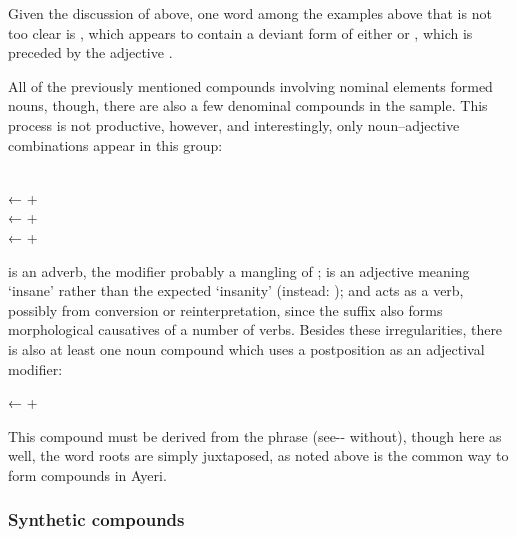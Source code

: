 Given the discussion of  above, one word among the examples 
above that is not too clear is , which appears to 
contain a deviant form of either  or 
, which is preceded by the adjective 
.

All of the previously mentioned compounds involving nominal elements formed 
nouns, though, there are also a few denominal compounds in the sample. This 
process is not productive, however, and interestingly, only noun–adjective 
combinations appear in this group:

\pex
	\a {} \\
		← 
		+ \ques{}\,
	\a {} \\
		← 
		+ 
	\a {} \\
		← 
		+ 
\xe

 is an adverb, the modifier probably a mangling of 
;  is an adjective meaning `insane' 
rather than the expected `insanity' (instead: ); 
and  acts as a verb, possibly from conversion or 
reinterpretation, since the suffix  also forms morphological 
causatives of a number of verbs. Besides these irregularities, there is also at 
least one noun compound which uses a postposition as an adjectival modifier:

\ex
	← 
	+ 
\xe

This compound must be derived from the phrase  (see-\Nmlz{}-\Loc{} without), though here as well, the 
word roots are simply juxtaposed, as noted above is the common way to form 
compounds in Ayeri.


\subsubsection{Synthetic compounds}

